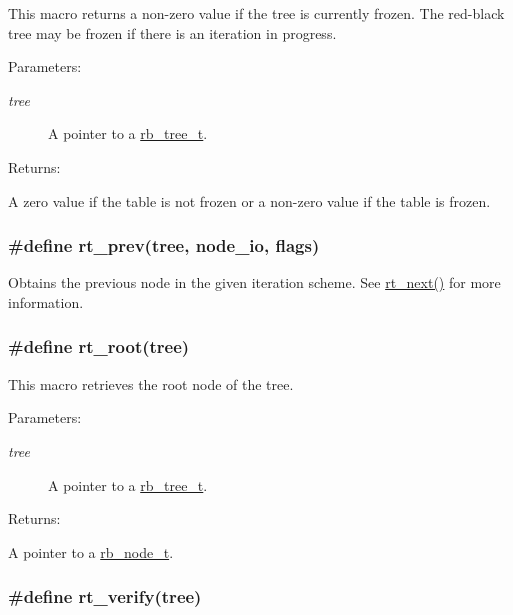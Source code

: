 This macro returns a non-zero value if the tree is currently frozen. The red-black tree may be frozen if there is an iteration in progress.\begin{Desc}
\item[Parameters: ]\par
\begin{description}
\item[{\em 
tree}]A pointer to a \hyperlink{group__dbprim__rbtree_a0}{rb\_\-tree\_\-t}.\end{description}
\end{Desc}
\begin{Desc}
\item[Returns: ]\par
A zero value if the table is not frozen or a non-zero value if the table is frozen. \end{Desc}
\hypertarget{group__dbprim__rbtree_a24}{
\subsubsection[rt\_\-prev]{\setlength{\rightskip}{0pt plus 5cm}\#define rt\_\-prev(tree, node\_\-io, flags)}}
\label{group__dbprim__rbtree_a24}


Obtains the previous node in the given iteration scheme. See \hyperlink{group__dbprim__rbtree_a10}{rt\_\-next()} for more information. \hypertarget{group__dbprim__rbtree_a18}{
\subsubsection[rt\_\-root]{\setlength{\rightskip}{0pt plus 5cm}\#define rt\_\-root(tree)}}
\label{group__dbprim__rbtree_a18}


This macro retrieves the root node of the tree.\begin{Desc}
\item[Parameters: ]\par
\begin{description}
\item[{\em 
tree}]A pointer to a \hyperlink{group__dbprim__rbtree_a0}{rb\_\-tree\_\-t}.\end{description}
\end{Desc}
\begin{Desc}
\item[Returns: ]\par
A pointer to a \hyperlink{group__dbprim__rbtree_a1}{rb\_\-node\_\-t}. \end{Desc}
\hypertarget{group__dbprim__rbtree_a15}{
\subsubsection[rt\_\-verify]{\setlength{\rightskip}{0pt plus 5cm}\#define rt\_\-verify(tree)}}
\label{group__dbprim__rbtree_a15}


